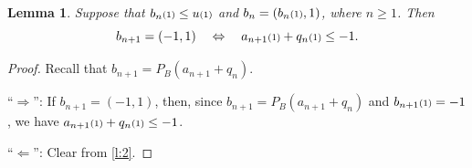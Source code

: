 \documentclass[12pt]{article}
\newtheorem{lemma}[theorem]{Lemma}
\newcommand{\kkk}[1]{\ensuremath{\textstyle\mathsmaller{({#1})}}}
\begin{document}
\begin{lemma}
  \label{l:4}
Suppose that $b_n\kkk{1}\leq u\kkk{1}$ and $b_n=(b_n\kkk{1},1)$, 
where $n\geq 1$. 
Then
\begin{equation}
b_{n+1} = (-1,1)
\quad\Leftrightarrow\quad
a_{n+1}\kkk{1}+q_n\kkk{1} \leq -1.
\end{equation}
\end{lemma}
\begin{proof}
Recall that $b_{n+1} = P_B(a_{n+1}+q_n)$.

``$\Rightarrow$'':
If $b_{n+1} = (-1,1)$, 
then, 
since $b_{n+1}=P_B(a_{n+1}+q_n)$ 
and $b_{n+1}\kkk{1} =-1$, we have 
$a_{n+1}\kkk{1}+q_n\kkk{1}\leq -1$.

``$\Leftarrow$'':
Clear from \cref{l:2}.
\end{proof}
\end{document}
